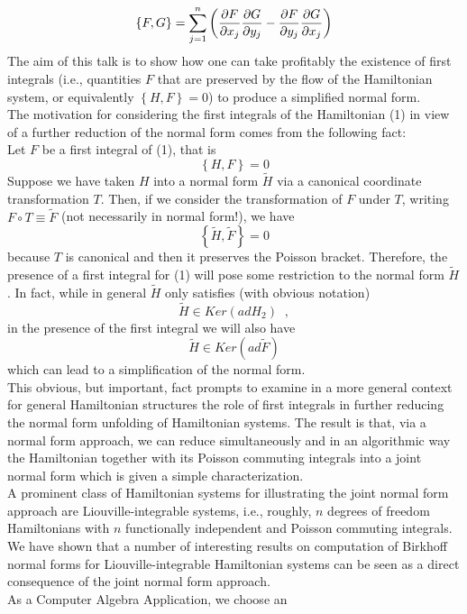 \documentclass[11pt,thmsa]{article}
\begin{document}
\[
\left\{ F,G\right\} =\sum\limits_{j=1}^n\left( \frac{\partial F}{\partial
x_j}\frac{\partial G}{\partial y_j}-\frac{\partial F}{\partial y_j}\frac{%
\partial G}{\partial x_j}\right) 
\]
The aim of this talk is to show how one can take profitably the
existence of first integrals (i.e., quantities $F$ that are preserved by the
flow of the Hamiltonian system, or equivalently $\left\{ H,F\right\} =0$) to
produce a simplified normal form.\\ The motivation for considering the first
integrals of the Hamiltonian (1) in view of a further reduction of the
normal form comes from the following fact:\\ Let $F$ be a first integral of
(1), that is 
\[
\left\{ H,F\right\} =0
\]
Suppose we have taken $H$ into a normal form $\widetilde{H}$ via a canonical
coordinate transformation $T$. Then, if we consider the transformation of $F$
under $T$, writing $F\circ T\equiv \widetilde{F}$ (not necessarily in normal
form!), we have 
\[
\left\{ \widetilde{H},\widetilde{F}\right\} =0
\]
because $T$ is canonical and then it preserves the Poisson bracket.
Therefore, the presence of a first integral for (1) will pose some
restriction to the normal form $\widetilde{H}$. In fact, while in general $%
\widetilde{H}$ only satisfies (with obvious notation) 
\[
\widetilde{H}\in Ker\left( adH_2\right) \;\;,
\]
in the presence of the first integral we will also have 
\[
\widetilde{H}\in Ker\left( ad\widetilde{F}\right) 
\]
which can lead to a simplification of the normal form.\\[0.2cm] This
obvious, but important, fact prompts to examine in a more general context
for general Hamiltonian structures the role of first integrals in further
reducing the normal form unfolding of Hamiltonian systems. The result is
that, via a normal form approach, we can reduce simultaneously and in an
algorithmic way the Hamiltonian together with its Poisson commuting
integrals into a joint normal form which is given a simple characterization.\\[0.2cm] A prominent class of Hamiltonian systems for illustrating the
joint normal form approach are Liouville-integrable systems, i.e., roughly, $%
n$ degrees of freedom Hamiltonians with $n$ functionally independent and
Poisson commuting integrals. We have shown that a number of interesting
results on computation of Birkhoff normal forms for Liouville-integrable
Hamiltonian systems can be seen as a direct consequence of the joint normal
form approach.\\[0.2cm] As a Computer Algebra Application, we choose an
\end{document}
